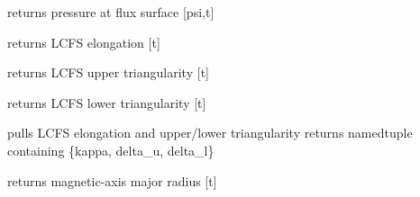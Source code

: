 \documentclass[letterpaper,10pt,english]{sphinxmanual}
\begin{document}
\begin{fulllineitems}
\begin{fulllineitems}
\end{fulllineitems}


\begin{fulllineitems}
\label{eqtools:eqtools.EFIT.EFITTree.getFluxPres}
returns pressure at flux surface {[}psi,t{]}

\end{fulllineitems}


\begin{fulllineitems}
\label{eqtools:eqtools.EFIT.EFITTree.getElongation}
returns LCFS elongation {[}t{]}

\end{fulllineitems}


\begin{fulllineitems}
\label{eqtools:eqtools.EFIT.EFITTree.getUpperTriangularity}
returns LCFS upper triangularity {[}t{]}

\end{fulllineitems}


\begin{fulllineitems}
\label{eqtools:eqtools.EFIT.EFITTree.getLowerTriangularity}
returns LCFS lower triangularity {[}t{]}

\end{fulllineitems}


\begin{fulllineitems}
\label{eqtools:eqtools.EFIT.EFITTree.getShaping}
pulls LCFS elongation and upper/lower triangularity
returns namedtuple containing \{kappa, delta\_u, delta\_l\}

\end{fulllineitems}


\begin{fulllineitems}
\label{eqtools:eqtools.EFIT.EFITTree.getMagR}
returns magnetic-axis major radius {[}t{]}


\end{fulllineitems}
\end{fulllineitems}
\end{document}
